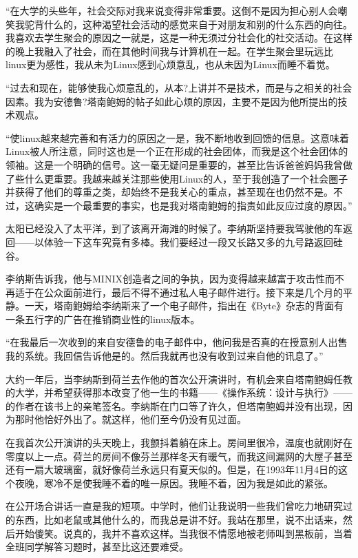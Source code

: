 “在大学的头些年，社会交际对我来说变得非常重要。这倒不是因为担心别人会嘲笑我驼背什么的，这种渴望社会活动的感觉来自于对朋友和别的什么东西的向往。我喜欢去学生聚会的原因之一就是，这是一种无须过分社会化的社交活动。在这样的晚上我融入了社会，而在其他时间我与计算机在一起。在学生聚会里玩远比linux更为感性，我从未为Linux感到心烦意乱，也从未因为Linux而睡不着觉。

“过去和现在，能够使我心烦意乱的，从本?上讲并不是技术，而是与之相关的社会因素。我为安德鲁?塔南鲍姆的帖子如此心烦的原因，主要不是因为他所提出的技术观点。

“使linux越来越完善和有活力的原因之一是，我不断地收到回馈的信息。这意味着Linux被人所注意，同时这也是一个正在形成的社会团体，而我是这个社会团体的领袖。这是一个明确的信号。这一毫无疑问是重要的，甚至比告诉爸爸妈妈我曾做了些什么更重要。我越来越关注那些使用Linux的人，至于我创造了一个社会圈子并获得了他们的尊重之类，却始终不是我关心的重点，甚至现在也仍然不是。不过，这确实是一个最重要的事实，也是我对塔南鲍姆的指责如此反应过度的原因。”

太阳已经没入了太平洋，到了该离开海滩的时候了。李纳斯坚持要我驾驶他的车返回——以体验一下这车究竟有多棒。我们要经过一段又长路又多的九号路返回硅谷。

李纳斯告诉我，他与MINIX创造者之间的争执，因为变得越来越富于攻击性而不再适于在公众面前进行，最后不得不通过私人电子邮件进行。接下来是几个月的平静。一天，塔南鲍姆给李纳斯来了一个电子邮件，指出在《Byte》杂志的背面有一条五行字的广告在推销商业性的linux版本。

“在我最后一次收到的来自安德鲁的电子邮件中，他问我是否真的在授意别人出售我的系统。我回信告诉他是的。然后我就再也没有收到过来自他的讯息了。”

大约一年后，当李纳斯到荷兰去作他的首次公开演讲时，有机会来自塔南鲍姆任教的大学，并希望获得那本改变了他一生的书籍——《操作系统：设计与执行》——的作者在该书上的亲笔签名。李纳斯在门口等了许久，但塔南鲍姆并没有出现，因为那时他恰好外出了。就这样，他们至今仍没有见过面。

 

在我首次公开演讲的头天晚上，我颤抖着躺在床上。房间里很冷，温度也就刚好在零度以上一点。荷兰的房间不像芬兰那样冬天有暖气，而我这间漏网的大屋子甚至还有一扇大玻璃窗，就好像荷兰永远只有夏天似的。但是，在1993年11月4日的这个夜晚，寒冷不是使我睡不着的唯一原因。我睡不着，因为我是如此的紧张。

在公开场合讲话一直是我的短项。中学时，他们让我说明一些我们曾吃力地研究过的东西，比如老鼠或其他什么的，而我总是讲不好。我站在那里，说不出话来，然后开始傻笑。说真的，我并不喜欢这样。当我很不情愿地被老师叫到黑板前，当着全班同学解答习题时，甚至比这还要难受。

